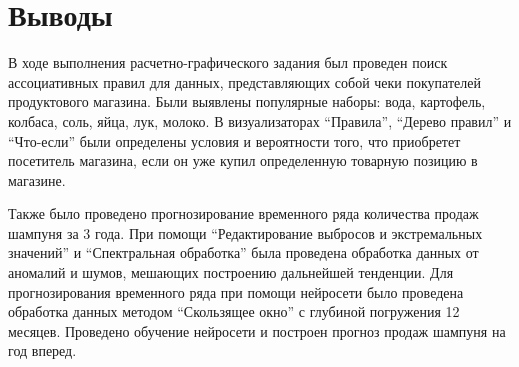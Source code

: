 \documentclass[a4paper,14pt]{extarticle}
\begin{document}
\pagebreak
\section*{Выводы}
В ходе выполнения расчетно-графического задания был проведен поиск ассоциативных
правил для данных, представляющих собой чеки покупателей продуктового магазина.
Были выявлены популярные наборы: вода, картофель, колбаса, соль, яйца, лук,
молоко. В визуализаторах \enquote{Правила}, \enquote{Дерево правил} и
\enquote{Что-если} были определены условия и вероятности того, что приобретет
посетитель магазина, если он уже купил определенную товарную позицию в
магазине.

Также было проведено прогнозирование временного ряда количества продаж шампуня
за 3 года. При помощи \enquote{Редактирование выбросов и экстремальных значений}
и \enquote{Спектральная обработка} была проведена обработка данных от аномалий и
шумов, мешающих построению дальнейшей тенденции. Для прогнозирования временного
ряда при помощи нейросети было проведена обработка данных методом
\enquote{Скользящее окно} с глубиной погружения 12 месяцев. Проведено обучение
нейросети и построен прогноз продаж шампуня на год вперед.
\end{document}
